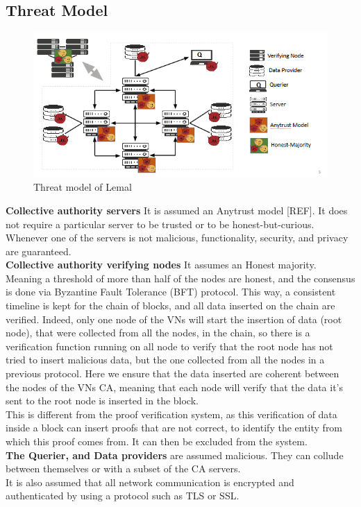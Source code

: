 \documentclass{article}
\begin{document}
\subsection{Threat Model}
\begin{figure}[H]
\center
\includegraphics[scale=0.75]{img/threatLemal.png}
\caption{Threat model of Lemal}
\end{figure}
\textbf{Collective authority servers} It is assumed an Anytrust model [REF]. It does not require a particular server to be trusted or to be honest-but-curious. Whenever one of the servers is not malicious, functionality, security, and privacy are guaranteed.\\
\textbf{Collective authority verifying nodes} It assumes an Honest majority. Meaning a threshold of more than half of the nodes are honest, and the consensus is done via Byzantine Fault Tolerance (BFT) protocol. This way, a consistent timeline is kept for the chain of blocks, and all data inserted on the chain are verified. Indeed, only one node of the VNs will start the insertion of data (root node), that were collected from all the nodes, in the chain, so there is a verification function running on all node to verify that the root node has not tried to insert malicious data, but the one collected from all the nodes in a previous protocol.
Here we ensure that the data inserted are coherent between the nodes of the VNs CA, meaning that each node will verify that the data it's sent to the root node is inserted in the block.\\
This is different from the proof verification system, as this verification of data inside a block can insert proofs that are not correct, to identify the entity from which this proof comes from. It can then be excluded from the system.\\
\textbf{The Querier, and Data providers} are assumed malicious. They can collude between themselves or with a subset of the CA servers.\\
It is also assumed that all network communication is encrypted and authenticated by using a protocol such as TLS or SSL.
\end{document}
